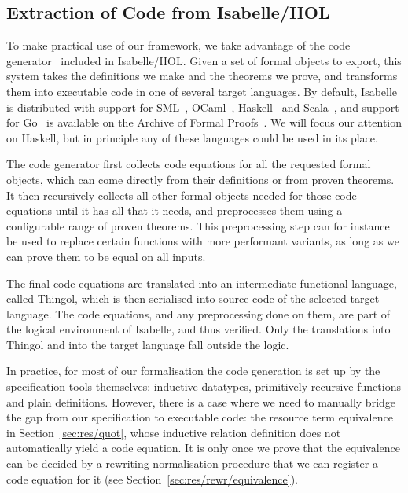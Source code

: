 \documentclass[class=smolathesis,crop=false]{standalone}
\begin{document}
\cbstart
\subsection{Extraction of Code from Isabelle/HOL}
\label{sec:intro/itp/codegen}

To make practical use of our framework, we take advantage of the code generator~\cite{isabelle-codegen} included in Isabelle/HOL\@.
Given a set of formal objects to export, this system takes the definitions we make and the theorems we prove, and transforms them into executable code in one of several target languages.
By default, Isabelle is distributed with support for SML~\cite{milner_et_al-1990}, OCaml~\cite{OCaml}, Haskell~\cite{jones_et_al-2003} and Scala~\cite{odersky_et_al-2004}, and support for Go~\cite{stubinger_hupel-2025} is available on the Archive of Formal Proofs~\cite{Go-AFP}.
We will focus our attention on Haskell, but in principle any of these languages could be used in its place.

The code generator first collects code equations for all the requested formal objects, which can come directly from their definitions or from proven theorems.
It then recursively collects all other formal objects needed for those code equations until it has all that it needs, and preprocesses them using a configurable range of proven theorems.
This preprocessing step can for instance be used to replace certain functions with more performant variants, as long as we can prove them to be equal on all inputs.

The final code equations are translated into an intermediate functional language, called Thingol, which is then serialised into source code of the selected target language.
The code equations, and any preprocessing done on them, are part of the logical environment of Isabelle, and thus verified.
Only the translations into Thingol and into the target language fall outside the logic.

In practice, for most of our formalisation the code generation is set up by the specification tools themselves: inductive datatypes, primitively recursive functions and plain definitions.
However, there is a case where we need to manually bridge the gap from our specification to executable code: the resource term equivalence in Section~\ref{sec:res/quot}, whose inductive relation definition does not automatically yield a code equation.
It is only once we prove that the equivalence can be decided by a rewriting normalisation procedure that we can register a code equation for it (see Section~\ref{sec:res/rewr/equivalence}).
\end{document}
